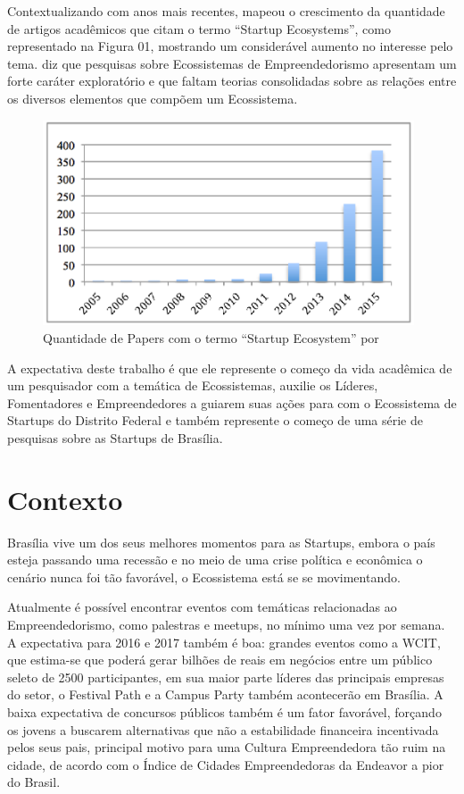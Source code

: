 Contextualizando com anos mais recentes,  mapeou o crescimento da quantidade de artigos acadêmicos que citam o termo ``Startup Ecosystems'', como representado na Figura 01, mostrando um considerável aumento no interesse pelo tema.  diz que pesquisas sobre Ecossistemas de Empreendedorismo apresentam um forte caráter exploratório e que faltam teorias consolidadas sobre as relações entre os diversos elementos que compõem um Ecossistema. 

\begin{figure}[!htb]
	\centering
	\includegraphics[width=11cm,angle=0]{figuras/papers_about_startup_ecosystems}
	\caption{Quantidade de Papers com o termo ``Startup Ecosystem'' por }
	\label{figure:papers_about_startup_ecosystems}
\end{figure}

A expectativa deste trabalho é que ele represente o começo da vida acadêmica de um pesquisador com a temática de Ecossistemas, auxilie os Líderes, Fomentadores e Empreendedores a guiarem suas ações para com o Ecossistema de Startups do Distrito Federal e também represente o começo de uma série de pesquisas sobre as Startups de Brasília. 

\section{Contexto}
\label{section:contexto}

Brasília vive um dos seus melhores momentos para as Startups, embora o país esteja passando uma recessão e no meio de uma crise política e econômica o cenário nunca foi tão favorável, o Ecossistema está se se movimentando. 

Atualmente é possível encontrar eventos com temáticas relacionadas ao Empreendedorismo, como palestras e meetups, no mínimo uma vez por semana. A expectativa para 2016 e 2017 também é boa: grandes eventos como a WCIT, que estima-se que poderá gerar bilhões de reais em negócios entre um público seleto de 2500 participantes, em sua maior parte líderes das principais empresas do setor, o Festival Path e a Campus Party também acontecerão em Brasília. A baixa expectativa de concursos públicos também é um fator favorável, forçando os jovens a buscarem alternativas que não a estabilidade financeira incentivada pelos seus pais, principal motivo para uma Cultura Empreendedora tão ruim na cidade, de acordo com o Índice de Cidades Empreendedoras da Endeavor a pior do Brasil.

